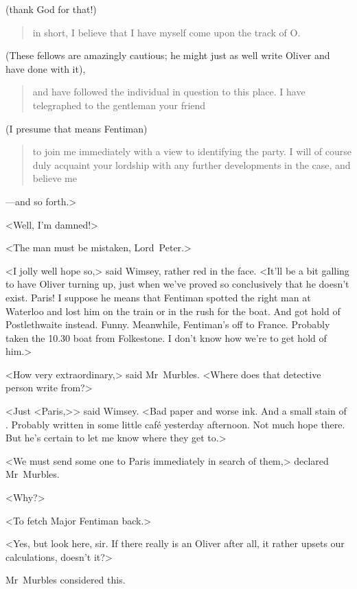 (thank God for that!) 

\begin{quotation}
in short, I believe that I have myself come upon the track of O\@.
\end{quotation} 

(These fellows are amazingly cautious; he might just as well write Oliver and have done with it), 

\begin{quotation}
and have followed the individual in question to this place. I have telegraphed to the gentleman your friend
\end{quotation} 

(I presume that means Fentiman) 

\begin{quotation}to join me immediately with a view to identifying the party. I will of course duly acquaint your lordship with any further developments in the case, and believe me\end{quotation}—and so forth.>

<Well, I'm damned!>

<The man must be mistaken, Lord~Peter.>

<I jolly well hope so,> said Wimsey, rather red in the face. <It'll be a bit galling to have Oliver turning up, just when we've proved so conclusively that he doesn't exist. Paris! I suppose he means that Fentiman spotted the right man at Waterloo and lost him on the train or in the rush for the boat. And got hold of Postlethwaite instead. Funny. Meanwhile, Fentiman's off to France. Probably taken the 10.30 boat from Folkestone. I don't know how we're to get hold of him.>

<How very extraordinary,> said Mr~Murbles. <Where does that detective person write from?>

<Just <Paris,>> said Wimsey. <Bad paper and worse ink. And a small stain of . Probably written in some little café yesterday afternoon. Not much hope there. But he's certain to let me know where they get to.>

<We must send some one to Paris immediately in search of them,> declared Mr~Murbles.

<Why?>

<To fetch Major Fentiman back.>

<Yes, but look here, sir. If there really is an Oliver after all, it rather upsets our calculations, doesn't it?>

Mr~Murbles considered this.

